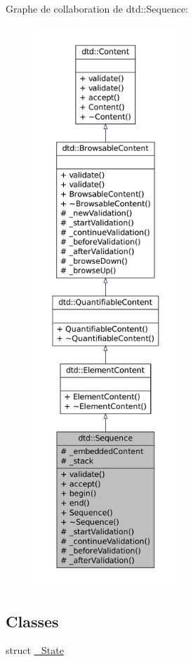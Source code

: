 Graphe de collaboration de dtd::Sequence:\nopagebreak
\begin{figure}[H]
\begin{center}
\leavevmode
\includegraphics[height=600pt]{classdtd_1_1_sequence__coll__graph}
\end{center}
\end{figure}
\subsection*{Classes}
\begin{DoxyCompactItemize}
\item 
struct \hyperlink{structdtd_1_1_sequence_1_1___state}{\_\-State}
\end{DoxyCompactItemize}
